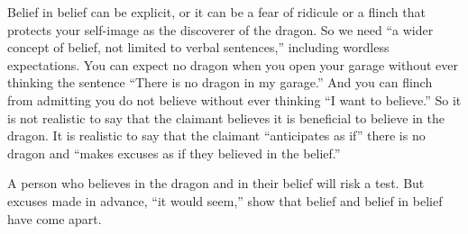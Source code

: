 Belief in belief can be explicit, or it can be a fear of ridicule or a flinch that protects your self-image as the discoverer of the dragon. So we need ``a wider concept of belief, not limited to verbal sentences,'' including wordless expectations.  You can expect no dragon when you open your garage without ever thinking the sentence ``There is no dragon in my garage.'' And you can flinch from admitting you do not believe without ever thinking ``I want to believe.'' So it is not realistic to say that the claimant believes it is beneficial to believe in the dragon. It is realistic to say that the claimant ``anticipates as if'' there is no dragon and ``makes excuses as if they believed in the belief.''

A person who believes in the dragon and in their belief will risk a test. But excuses made in advance, ``it would seem,'' show that belief and belief in belief have come apart.
